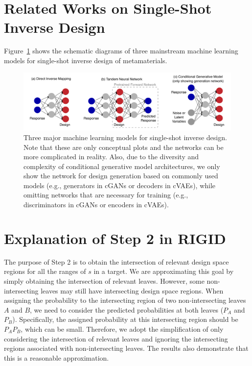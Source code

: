 \documentclass{article}
\begin{document}
\begin{appendices}

\section{Related Works on Single-Shot Inverse Design}
\label{sec:single_shot}

Figure~\ref{fig:support_past_work} shows the schematic diagrams of three mainstream machine learning models for single-shot inverse design of metamaterials.

\begin{figure}[h]
\centering
\includegraphics[width=\textwidth]{fig/support_past_work.pdf}
\caption{Three major machine learning models for single-shot inverse design. Note that these are only conceptual plots and the networks can be more complicated in reality. Also, due to the diversity and complexity of conditional generative model architectures, we only show the network for design generation based on commonly used models (e.g., generators in cGANs or decoders in cVAEs), while omitting networks that are necessary for training (e.g., discriminators in cGANs or encoders in cVAEs).}
\label{fig:support_past_work}
\end{figure}


\section{Explanation of Step 2 in RIGID}
\label{sec:app_step2}

The purpose of Step 2 is to obtain the intersection of relevant design space regions for all the ranges of $s$ in a target. We are approximating this goal by simply obtaining the intersection of relevant leaves. However, some non-intersecting leaves may still have intersecting design space regions. When assigning the probability to the intersecting region of two non-intersecting leaves $A$ and $B$, we need to consider the predicted probabilities at both leaves ($P_A$ and $P_B$). Specifically, the assigned probability at this intersecting region should be $P_AP_B$, which can be small. Therefore, we adopt the simplification of only considering the intersection of relevant leaves and ignoring the intersecting regions associated with non-intersecting leaves. The results also demonstrate that this is a reasonable approximation.



\end{appendices}
\end{document}
